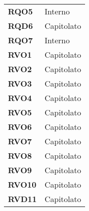 \begin{longtable}[H]{>{\centering\bfseries}m{8cm} >{\centering\arraybackslash}m{8cm}}
    RQO5
    
        & Interno \\

    RQD6

        & Capitolato \\

    RQO7
        & Interno \\
    
     RVO1
 
        & Capitolato \\

    RVO2
   
        & Capitolato \\

    RVO3

        & Capitolato \\

    RVO4

        & Capitolato \\

    RVO5
  
        & Capitolato \\

    RVO6
  
        & Capitolato \\

    RVO7
   
        & Capitolato \\

    RVO8
    
        & Capitolato \\

    RVO9
     
        & Capitolato \\

    RVO10
   
        & Capitolato \\

    RVD11
       
        & Capitolato \\


\end{longtable}